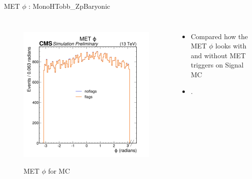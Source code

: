 \documentclass[10pt,xcolor=dvipsnames]{beamer}
\begin{document}
    \begin{frame}[fragile]{MET $\phi$ : MonoHTobb\_ZpBaryonic} 
      \begin{columns}
      \begin{figure} 
      \centering 
       \includegraphics[width=1\textwidth]{../Archive/KinemPlots/MCphiMETflags.png }
      \label{METData} 
      \caption{MET $\phi$ for MC}
      \end{figure} 
      \begin{itemize} 
      \raggedright 
      \small
      \item Compared how the MET $\phi$ looks with and without MET triggers on Signal MC
      \item .
      \end{itemize}
      \end{columns} 
      \end{frame}


\end{document}
